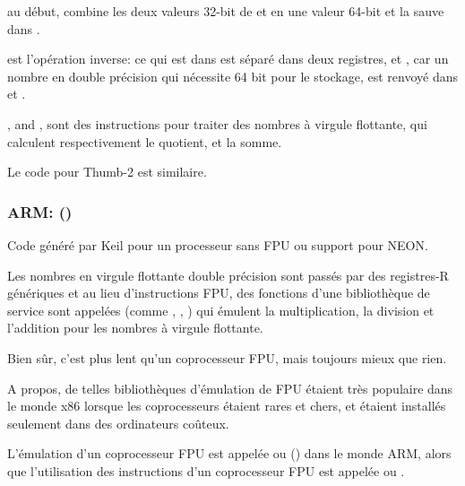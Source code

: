  au début, combine les deux valeurs 32-bit de  et 
en une valeur 64-bit et la sauve dans .

 est l'opération inverse: ce qui est dans  est séparé
dans deux registres,  et , car un nombre en double précision qui
nécessite 64 bit pour le stockage, est renvoyé dans  et .

,  and , 
sont des instructions pour traiter des nombres à virgule flottante, qui calculent
respectivement le \gls{quotient},  et la somme.

Le code pour Thumb-2 est similaire.

\subsubsection{ARM: \OptimizingKeilVI (\ThumbMode)}



Code généré par Keil pour un processeur sans FPU ou support pour NEON.

Les nombres en virgule flottante double précision sont passés par des registres-R
génériques et au lieu d'instructions FPU, des fonctions d'une bibliothèque de service
sont appelées (comme , , )
qui émulent la multiplication, la division et l'addition pour les nombres à virgule
flottante.

Bien sûr, c'est plus lent qu'un coprocesseur FPU, mais toujours mieux que rien.

A propos, de telles bibliothèques d'émulation de FPU étaient très populaire dans
le monde x86 lorsque les coprocesseurs étaient rares et chers, et étaient installés
seulement dans des ordinateurs coûteux.


L'émulation d'un coprocesseur FPU est appelée  ou  ()
dans le monde ARM, alors que l'utilisation des instructions d'un coprocesseur FPU
est appelée  ou .

\iffalse


